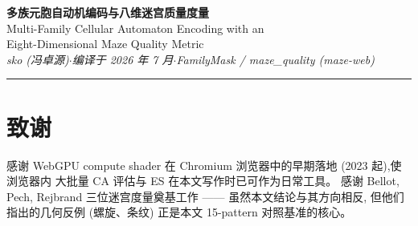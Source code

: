 \documentclass[11pt,a4paper]{article}
\theoremstyle{plainstyle}
\begin{document}
\begin{center}
{\LARGE\bfseries\color{InkWarm} 多族元胞自动机编码与八维迷宫质量度量}\\[0.4em]
{\large\color{GrayMid} Multi-Family Cellular Automaton Encoding with an\\
Eight-Dimensional Maze Quality Metric}\\[0.7em]
{\small\itshape\color{GrayMid} sko (冯卓源)\quad$\cdot$\quad 编译于 2026 年 7 月\quad$\cdot$\quad FamilyMask / maze\_quality (maze-web)}
\end{center}

\vspace{0.4em}
\noindent\rule{\linewidth}{0.4pt}
\vspace{0.8em}



\tableofcontents
\vspace{0.4em}









\section*{致谢}
感谢 WebGPU compute shader 在 Chromium 浏览器中的早期落地 (2023 起),使浏览器内
大批量 CA 评估与 ES 在本文写作时已可作为日常工具。
感谢 Bellot, Pech, Rejbrand 三位迷宫度量奠基工作 —— 虽然本文结论与其方向相反,
但他们指出的几何反例 (螺旋、条纹) 正是本文 15-pattern 对照基准的核心。



\end{document}
